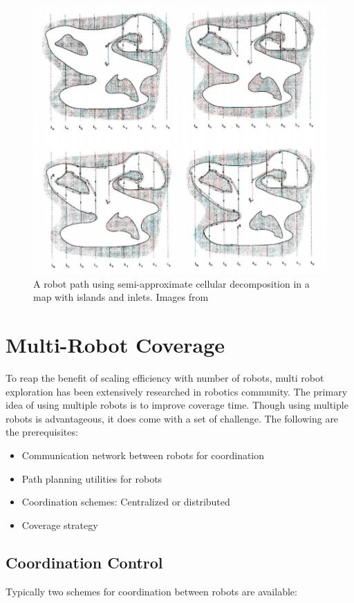 \begin{figure}
    \centering
    \includegraphics[width=\textwidth]{images/semiapproximate.png}
    \caption{A robot path using semi-approximate cellular decomposition in a map with islands and inlets. Images from \cite{35}}
    \label{fig:my_label}
\end{figure}

\section{Multi-Robot Coverage}
To reap the benefit of scaling efficiency with number of robots, multi robot exploration has been extensively researched in robotics community. The primary idea of using multiple robots is to improve coverage time. Though using multiple robots is advantageous, it does come with a set of challenge. The following are the prerequisites:
\begin{itemize}
    \item Communication network between robots for coordination
    \item Path planning utilities for robots
    \item Coordination schemes: Centralized or distributed
    \item Coverage strategy
\end{itemize}

\subsection{Coordination Control}
Typically two schemes for coordination between robots are available:


